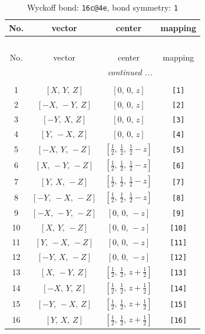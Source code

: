 \documentclass[fleqn,8pt]{jsarticle}
\begin{document}
\begin{longtable}{cccc}
\caption{Wyckoff bond: {\tt 16c@4e}, bond symmetry: {\tt 1}}
 \\
 \hline \hline
No. & vector & center & mapping \\ \hline \endfirsthead

\multicolumn{3}{l}{\tablename\ \thetable{}} \\
 \hline \hline
No. & vector & center & mapping \\ \hline \endhead

 \hline \hline
\multicolumn{3}{r}{\footnotesize\it continued ...} \\ \endfoot

 \hline \hline
\multicolumn{3}{r}{} \\ \endlastfoot

1 & $\left[ X,\, Y,\, Z \right]$ & $\left[ 0,\, 0,\, z \right]$ & {\tt [1]} \\ \hline
2 & $\left[ - X,\, - Y,\, Z \right]$ & $\left[ 0,\, 0,\, z \right]$ & {\tt [2]} \\ \hline
3 & $\left[ - Y,\, X,\, Z \right]$ & $\left[ 0,\, 0,\, z \right]$ & {\tt [3]} \\ \hline
4 & $\left[ Y,\, - X,\, Z \right]$ & $\left[ 0,\, 0,\, z \right]$ & {\tt [4]} \\ \hline
5 & $\left[ - X,\, Y,\, - Z \right]$ & $\left[ \frac{1}{2},\, \frac{1}{2},\, \frac{1}{2} - z \right]$ & {\tt [5]} \\ \hline
6 & $\left[ X,\, - Y,\, - Z \right]$ & $\left[ \frac{1}{2},\, \frac{1}{2},\, \frac{1}{2} - z \right]$ & {\tt [6]} \\ \hline
7 & $\left[ Y,\, X,\, - Z \right]$ & $\left[ \frac{1}{2},\, \frac{1}{2},\, \frac{1}{2} - z \right]$ & {\tt [7]} \\ \hline
8 & $\left[ - Y,\, - X,\, - Z \right]$ & $\left[ \frac{1}{2},\, \frac{1}{2},\, \frac{1}{2} - z \right]$ & {\tt [8]} \\ \hline
9 & $\left[ - X,\, - Y,\, - Z \right]$ & $\left[ 0,\, 0,\, - z \right]$ & {\tt [9]} \\ \hline
10 & $\left[ X,\, Y,\, - Z \right]$ & $\left[ 0,\, 0,\, - z \right]$ & {\tt [10]} \\ \hline
11 & $\left[ Y,\, - X,\, - Z \right]$ & $\left[ 0,\, 0,\, - z \right]$ & {\tt [11]} \\ \hline
12 & $\left[ - Y,\, X,\, - Z \right]$ & $\left[ 0,\, 0,\, - z \right]$ & {\tt [12]} \\ \hline
13 & $\left[ X,\, - Y,\, Z \right]$ & $\left[ \frac{1}{2},\, \frac{1}{2},\, z + \frac{1}{2} \right]$ & {\tt [13]} \\ \hline
14 & $\left[ - X,\, Y,\, Z \right]$ & $\left[ \frac{1}{2},\, \frac{1}{2},\, z + \frac{1}{2} \right]$ & {\tt [14]} \\ \hline
15 & $\left[ - Y,\, - X,\, Z \right]$ & $\left[ \frac{1}{2},\, \frac{1}{2},\, z + \frac{1}{2} \right]$ & {\tt [15]} \\ \hline
16 & $\left[ Y,\, X,\, Z \right]$ & $\left[ \frac{1}{2},\, \frac{1}{2},\, z + \frac{1}{2} \right]$ & {\tt [16]} \\
\end{longtable}
\end{document}
